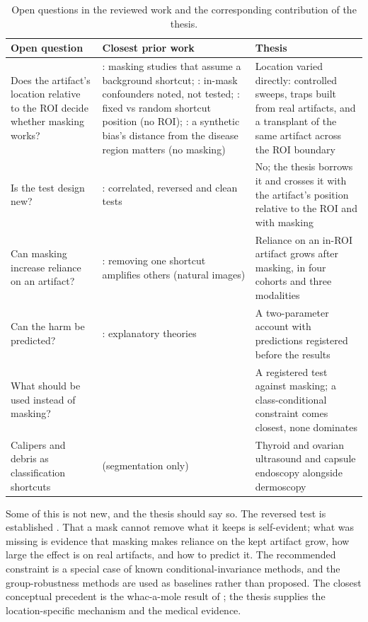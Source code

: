 \documentclass[11pt,a4paper]{article}
\begin{document}
\begin{table}[ht]\centering\small
\caption{Open questions in the reviewed work and the corresponding contribution of the thesis.}\label{tab:gaps}
\begin{tabular}{P{4.6cm}P{4.6cm}P{5.6cm}}\toprule
Open question & Closest prior work & Thesis \\\midrule
Does the artifact's location relative to the ROI decide whether masking works? & \citet{sourget2025mask,maron2021confounding,bassi2024isnet}: masking studies that assume a background shortcut; \citet{viviano2021saliency,benahmed2022multisite,pahde2025ensuring}: in-mask confounders noted, not tested; \citet{boland2024shortcuts}: fixed vs random shortcut position (no ROI); \citet{stanley2024simba}: a synthetic bias's distance from the disease region matters (no masking) & Location varied directly: controlled sweeps, traps built from real artifacts, and a transplant of the same artifact across the ROI boundary \\
Is the test design new? & \citet{arjovsky2019irm,puli2022nurd,bassi2024isnet,corbetta2026beyond}: correlated, reversed and clean tests & No; the thesis borrows it and crosses it with the artifact's position relative to the ROI and with masking \\
Can masking increase reliance on an artifact? & \citet{li2023whacamole}: removing one shortcut amplifies others (natural images) & Reliance on an in-ROI artifact grows after masking, in four cohorts and three modalities \\
Can the harm be predicted? & \citet{hermann2024foundations,puli2023dontblame}: explanatory theories & A two-parameter account with predictions registered before the results \\
What should be used instead of masking? & \citet{veitch2021counterfactual,makar2022causally,zong2023medfair} & A registered test against masking; a class-conditional constraint comes closest, none dominates \\
Calipers and debris as classification shortcuts & \citet{lin2024segshortcut} (segmentation only) & Thyroid and ovarian ultrasound and capsule endoscopy alongside dermoscopy \\\bottomrule
\end{tabular}\end{table}

Some of this is not new, and the thesis should say so. The reversed test is established
\citep{arjovsky2019irm,puli2022nurd,bassi2024isnet,corbetta2026beyond}. That a mask cannot remove what it keeps is
self-evident; what was
missing is evidence that masking makes reliance on the kept artifact grow, how large the effect is on real artifacts,
and how to predict it. The recommended constraint is a special case of known conditional-invariance methods, and the
group-robustness methods are used as baselines rather than proposed. The closest conceptual precedent is the
whac-a-mole result of \citet{li2023whacamole}; the thesis supplies the location-specific mechanism and the medical
evidence.
\end{document}
